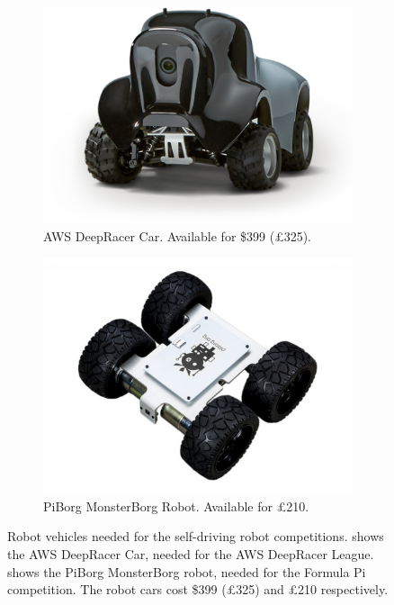 \documentclass{l4proj}
\begin{document}
\begin{figure}[!h]
    \centering
    \begin{subfigure}[b]{0.44\textwidth}
        \includegraphics[width=\textwidth]{images/DeepRacer.png}
        \caption{AWS DeepRacer Car. Available for \$399 (£325).}
        \label{fig:deepcar}
    \end{subfigure}
    \quad
    \begin{subfigure}[b]{0.44\textwidth}
        \includegraphics[width=\textwidth]{images/piborg.jpg}
        \caption{PiBorg MonsterBorg Robot. Available for £210.}
        \label{fig:piborg-car}
    \end{subfigure}   
    \caption{Robot vehicles needed for the self-driving robot competitions.  shows the AWS DeepRacer Car, needed for the AWS DeepRacer League.  shows the PiBorg MonsterBorg robot, needed for the Formula Pi competition. The robot cars cost \$399 (£325) and £210 respectively.
    }\label{fig:robot-cars}
\end{figure}
\end{document}
